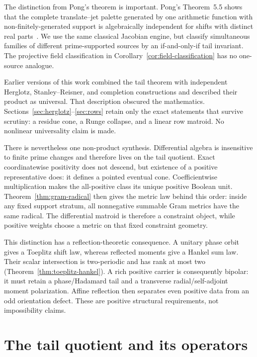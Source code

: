 \documentclass[11pt]{article}
\theoremstyle{definition}
\theoremstyle{remark}
\begin{document}
The distinction from Pong's theorem is important.  Pong's Theorem~5.5 shows that the complete
translate--jet palette generated by one arithmetic function with non-finitely-generated support
is algebraically independent for shifts with distinct real parts~\cite{Pong2016}.  We use the
same classical Jacobian engine, but classify simultaneous families of different prime-supported
sources by an if-and-only-if tail invariant.  The projective field classification in
Corollary~\ref{cor:field-classification} has no one-source analogue.

Earlier versions of this work combined the tail theorem with independent Herglotz,
Stanley--Reisner, and completion constructions and described their product as universal.  That
description obscured the mathematics.  Sections~\ref{sec:herglotz}--\ref{sec:rows} retain only
the exact statements that survive scrutiny: a residue cone, a Runge collapse, and a linear row
matroid.  No nonlinear universality claim is made.

There is nevertheless one non-product synthesis.  Differential algebra is insensitive to finite
prime changes and therefore lives on the tail quotient.  Exact coordinatewise positivity does
not descend, but existence of a positive representative does: it defines a pointed eventual
cone.  Coefficientwise multiplication makes the all-positive class its unique positive Boolean
unit.  Theorem~\ref{thm:gram-radical} then gives the metric law behind this order: inside any
fixed support stratum, all nonnegative summable Gram metrics have the same radical.  The
differential matroid is therefore a constraint object, while positive weights choose a metric on
that fixed constraint geometry.

This distinction has a reflection-theoretic consequence.  A unitary phase orbit gives a
Toeplitz shift law, whereas reflected moments give a Hankel sum law.  Their scalar intersection
is two-periodic and has rank at most two (Theorem~\ref{thm:toeplitz-hankel}).  A rich positive
carrier is consequently bipolar: it must retain a phase/Hadamard tail and a transverse
radial/self-adjoint moment polarization.  Affine reflection then separates even positive data
from an odd orientation defect.  These are positive structural requirements, not impossibility
claims.

\section{The tail quotient and its operators}
\end{document}
